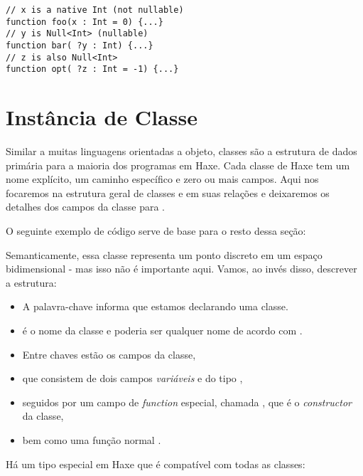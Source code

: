 \begin{lstlisting}
// x is a native Int (not nullable)
function foo(x : Int = 0) {...}
// y is Null<Int> (nullable)
function bar( ?y : Int) {...}
// z is also Null<Int>
function opt( ?z : Int = -1) {...}
\end{lstlisting}


\section{Instância de Classe}
\label{types-class-instance}

Similar a muitas linguagens orientadas a objeto, classes são a estrutura de dados primária para a maioria dos programas em Haxe. Cada classe de Haxe tem um nome explícito, um caminho específico e zero ou mais campos. Aqui nos focaremos na estrutura geral de classes e em suas relações e deixaremos os detalhes dos campos da classe para .

O seguinte exemplo de código serve de base para o resto dessa seção:


Semanticamente, essa classe representa um ponto discreto em um espaço bidimensional - mas isso não é importante aqui. Vamos, ao invés disso, descrever a estrutura: 

\begin{itemize}
	\item A palavra-chave  informa que estamos declarando uma classe.
	\item {} é o nome da classe e poderia ser qualquer nome de acordo com .
	\item Entre chaves \expr{$\left\{\right\}$} estão os campos da classe,
	\item que consistem de dois campos \emph{variáveis}  e  do tipo ,
	\item seguidos por um campo de \emph{function} especial, chamada , que é o \emph{constructor} da classe,
	\item bem como uma função normal .
\end{itemize}
Há um tipo especial em Haxe que é compatível com todas as classes:

